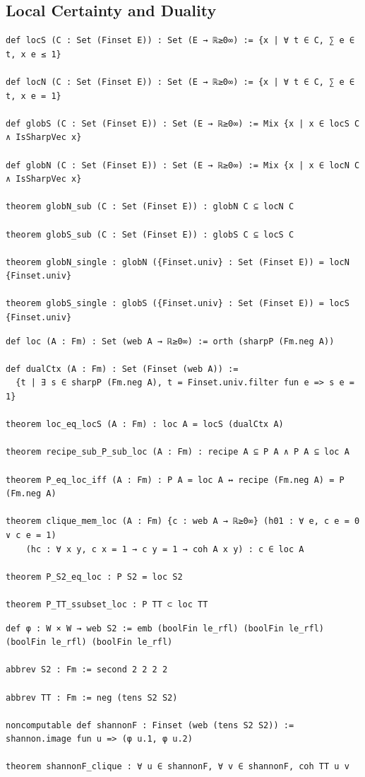 \subsection{Local Certainty and Duality}

\label{lean:local-calc}
\begin{lstlisting}
def locS (C : Set (Finset E)) : Set (E → ℝ≥0∞) := {x | ∀ t ∈ C, ∑ e ∈ t, x e ≤ 1}

def locN (C : Set (Finset E)) : Set (E → ℝ≥0∞) := {x | ∀ t ∈ C, ∑ e ∈ t, x e = 1}

def globS (C : Set (Finset E)) : Set (E → ℝ≥0∞) := Mix {x | x ∈ locS C ∧ IsSharpVec x}

def globN (C : Set (Finset E)) : Set (E → ℝ≥0∞) := Mix {x | x ∈ locN C ∧ IsSharpVec x}

theorem globN_sub (C : Set (Finset E)) : globN C ⊆ locN C

theorem globS_sub (C : Set (Finset E)) : globS C ⊆ locS C

theorem globN_single : globN ({Finset.univ} : Set (Finset E)) = locN {Finset.univ}

theorem globS_single : globS ({Finset.univ} : Set (Finset E)) = locS {Finset.univ}
\end{lstlisting}

\label{lean:loc-linear}
\begin{lstlisting}
def loc (A : Fm) : Set (web A → ℝ≥0∞) := orth (sharpP (Fm.neg A))

def dualCtx (A : Fm) : Set (Finset (web A)) :=
  {t | ∃ s ∈ sharpP (Fm.neg A), t = Finset.univ.filter fun e => s e = 1}

theorem loc_eq_locS (A : Fm) : loc A = locS (dualCtx A)

theorem recipe_sub_P_sub_loc (A : Fm) : recipe A ⊆ P A ∧ P A ⊆ loc A

theorem P_eq_loc_iff (A : Fm) : P A = loc A ↔ recipe (Fm.neg A) = P (Fm.neg A)

theorem clique_mem_loc (A : Fm) {c : web A → ℝ≥0∞} (h01 : ∀ e, c e = 0 ∨ c e = 1)
    (hc : ∀ x y, c x = 1 → c y = 1 → coh A x y) : c ∈ loc A

theorem P_S2_eq_loc : P S2 = loc S2

theorem P_TT_ssubset_loc : P TT ⊂ loc TT
\end{lstlisting}

\label{lean:shannon-clique}
\begin{lstlisting}
def φ : W × W → web S2 := emb (boolFin le_rfl) (boolFin le_rfl) (boolFin le_rfl) (boolFin le_rfl)

abbrev S2 : Fm := second 2 2 2 2

abbrev TT : Fm := neg (tens S2 S2)

noncomputable def shannonF : Finset (web (tens S2 S2)) := shannon.image fun u => (φ u.1, φ u.2)

theorem shannonF_clique : ∀ u ∈ shannonF, ∀ v ∈ shannonF, coh TT u v
\end{lstlisting}


